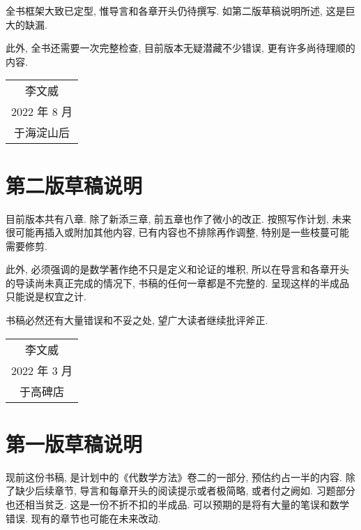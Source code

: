 全书框架大致已定型, 惟导言和各章开头仍待撰写. 如第二版草稿说明所述, 这是巨大的缺漏.

此外, 全书还需要一次完整检查, 目前版本无疑潜藏不少错误, 更有许多尚待理顺的内容.

\vspace{1em}
\begin{flushright}\begin{minipage}{0.3 \textwidth}
		\begin{tabular}{c}
			{\fangsong 李文威} \\
			2022 年 8 月 \\
			于海淀山后
		\end{tabular}
\end{minipage}\end{flushright}
\vspace{1em}

\section*{第二版草稿说明}
目前版本共有八章. 除了新添三章, 前五章也作了微小的改正. 按照写作计划, 未来很可能再插入或附加其他内容, 已有内容也不排除再作调整, 特别是一些枝蔓可能需要修剪.

此外, 必须强调的是数学著作绝不只是定义和论证的堆积, 所以在导言和各章开头的导读尚未真正完成的情况下, 书稿的任何一章都是不完整的. 呈现这样的半成品只能说是权宜之计.

书稿必然还有大量错误和不妥之处, 望广大读者继续批评斧正.

\vspace{1em}
\begin{flushright}\begin{minipage}{0.3 \textwidth}
		\begin{tabular}{c}
			{\fangsong 李文威} \\
			2022 年 3 月 \\
			于高碑店
		\end{tabular}
\end{minipage}\end{flushright}
\vspace{1em}

\section*{第一版草稿说明}

现前这份书稿, 是计划中的《代数学方法》卷二的一部分, 预估约占一半的内容. 除了缺少后续章节, 导言和每章开头的阅读提示或者极简略, 或者付之阙如. 习题部分也还相当贫乏. 这是一份不折不扣的半成品. 可以预期的是将有大量的笔误和数学错误. 现有的章节也可能在未来改动.


